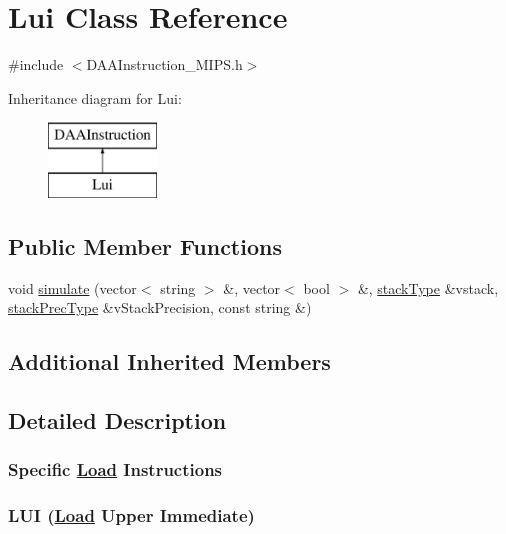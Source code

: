 \hypertarget{classLui}{}\section{Lui Class Reference}
\label{classLui}


{\ttfamily \#include $<$D\+A\+A\+Instruction\+\_\+\+M\+I\+P\+S.\+h$>$}

Inheritance diagram for Lui\+:\begin{figure}[H]
\begin{center}
\leavevmode
\includegraphics[height=2.000000cm]{classLui}
\end{center}
\end{figure}
\subsection*{Public Member Functions}
\begin{DoxyCompactItemize}
\item 
void \hyperlink{classLui_acdaa22ad7bf3485619585ea8c6adbda4}{simulate} (vector$<$ string $>$ \&, vector$<$ bool $>$ \&, \hyperlink{DAAInstruction_8h_a1b0e70ac1a04f06c8132055ed01f589f}{stack\+Type} \&vstack, \hyperlink{DAAInstruction_8h_ac5cb793e9dac3fa9693da78b7e29ab30}{stack\+Prec\+Type} \&v\+Stack\+Precision, const string \&)
\end{DoxyCompactItemize}
\subsection*{Additional Inherited Members}


\subsection{Detailed Description}


 \subsubsection*{Specific \hyperlink{classLoad}{Load} Instructions }

\subsubsection*{L\+UI (\hyperlink{classLoad}{Load} Upper Immediate) }

